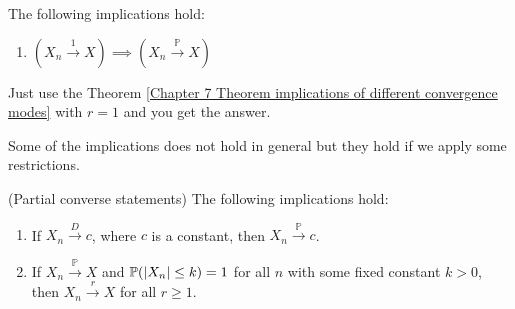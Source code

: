 \documentclass{huhtakm-template-book}
\newcommand{\prob}{\mathbb{P}}
\begin{document}
\begin{lem}
    The following implications hold:
    \begin{enumerate}
        \item $(X_{n}\xrightarrow{1}X)\implies(X_{n}\xrightarrow{\prob}X)$
    \end{enumerate}
\end{lem}
\begin{proofing}
    Just use the Theorem \ref{Chapter 7 Theorem implications of different convergence modes} with $r=1$ and you get the answer.
\end{proofing}
Some of the implications does not hold in general but they hold if we apply some restrictions.
\begin{thm}(Partial converse statements)
    The following implications hold:
    \begin{enumerate}
        \item If $X_{n}\xrightarrow{D}c$, where $c$ is a constant, then $X_{n}\xrightarrow{\prob}c$.
        \item If $X_{n}\xrightarrow{\prob}X$ and $\prob(\abs{X_{n}}\leq k)=1$ for all $n$ with some fixed constant $k>0$, then $X_{n}\xrightarrow{r}X$ for all $r\geq 1$.
    \end{enumerate}
\end{thm}
\end{document}
